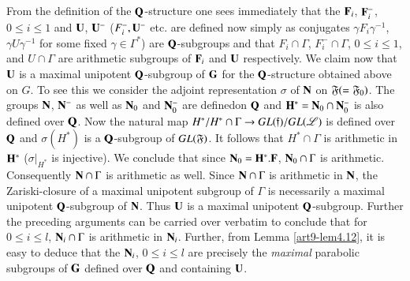 \subsection{}\label{art9-subsec4.41}
From the definition of the $\mathbf{Q}$-structure one sees immediately that the $\mathbf{F}_i$, $\mathbf{F}^-_i$, $0\leqslant i \leqslant 1$ and $\mathbf{U}$, $\mathbf{U}^-$ ($F^-_i, \mathbf{U}^-$ etc. are defined now simply as conjugates $\gamma F_i \gamma^{-1}$, $\gamma  U \gamma^{-1}$ for some fixed $\gamma \in \Gamma^\ast$) are $\mathbf{Q}$-subgroups and that $F_i \cap \Gamma$, $F^-_i \cap \Gamma$, $0 \leqslant i \leqslant 1$, and $U \cap \Gamma$ are arithmetic subgroups of $\mathbf{F}_i$ and $\mathbf{U}$ respectively. We claim now that $\mathbf{U}$ is a maximal unipotent $\mathbf{Q}$-subgroup of $\mathbf{G}$ for the $\mathbf{Q}$-structure obtained above on $G$. To see this we consider the adjoint representation $\sigma$ of $\mathbf{N}$ on $\mathfrak{F} (= \mathfrak{F}_0)$. The groups $\mathbf{N}$, $\mathbf{N}^-$ as well as $\mathbf{N}_0$ and $\mathbf{N}^-_0$ are  defined\pageoriginale on $\mathbf{Q}$ and $\mathbf{H}^\ast = \mathbf{N}_0 \cap \mathbf{N}^-_0$  is also defined over $\mathbf{Q}$. Now the natural map $H^\ast / H^\ast \cap \Gamma \to G L (\mathfrak{f})/ GL (\mathscr{L})$ is defined over $\mathbf{Q}$ and $\sigma (H^\ast)$ is a $\mathbf{Q}$-subgroup of $GL(\mathfrak{F})$. It follows that $H^\ast \cap \Gamma$ is arithmetic in $\mathbf{H}^\ast$ ($\sigma \big|_{H^\ast}$ is injective).  We conclude that since $\mathbf{N}_0 =\mathbf{H}^\ast. \mathbf{F}$, $\mathbf{N}_0 \cap \Gamma$ is arithmetic. Consequently $\mathbf{N} \cap \Gamma$ is arithmetic as well. Since $\mathbf{N} \cap \Gamma$ is arithmetic in $\mathbf{N}$, the Zariski-closure of a maximal unipotent subgroup of $\Gamma$ is necessarily a maximal unipotent $\mathbf{Q}$-subgroup of $\mathbf{N}$. Thus $\mathbf{U}$ is a maximal unipotent $\mathbf{Q}$-subgroup. Further the preceding arguments can be carried over verbatim to conclude that for $0 \leqslant i \leqslant l$, $\mathbf{N}_i \cap \Gamma$ is arithmetic in $\mathbf{N}_i$. Further, from Lemma \ref{art9-lem4.12}, it is easy to deduce that the $\mathbf{N}_i$, $0 \leqslant i \leqslant l$ are precisely the \textit{maximal} parabolic subgroups of $\mathbf{G}$ defined over $\mathbf{Q}$ and containing $\mathbf{U}$.
 

